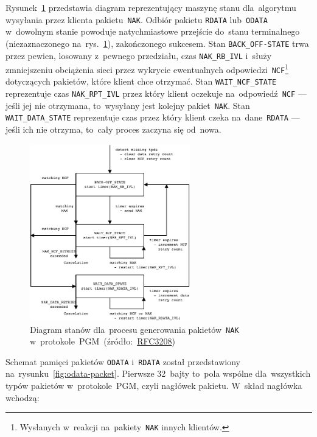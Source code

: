 \documentclass[thesis]{subfiles}
\begin{document}
Rysunek~\ref{fig:NAKflow} przedstawia diagram reprezentujący maszynę stanu dla~algorytmu wysyłania przez klienta pakietu~\texttt{NAK}. Odbiór pakietu \texttt{RDATA} lub~\texttt{ODATA} w~dowolnym stanie powoduje natychmiastowe przejście do~stanu terminalnego (niezaznaczonego na~rys.~\ref{fig:NAKflow}), zakończonego sukcesem. Stan \texttt{BACK\_OFF-STATE} trwa przez pewien, losowany z~pewnego przedziału, czas \texttt{NAK\_RB\_IVL} i~służy zmniejszeniu obciążenia sieci przez wykrycie ewentualnych odpowiedzi~\texttt{NCF}\footnote{Wysłanych w~reakcji na~pakiety~\texttt{NAK} innych klientów.} dotyczących pakietów, które klient chce otrzymać. Stan \texttt{WAIT\_NCF\_STATE} reprezentuje czas \texttt{NAK\_RPT\_IVL} przez który klient oczekuje na~odpowiedź~\texttt{NCF} --- jeśli jej nie otrzymana, to~wysyłany jest kolejny pakiet~\texttt{NAK}. Stan \texttt{WAIT\_DATA\_STATE} reprezentuje czas przez który klient czeka na~dane~\texttt{RDATA} --- jeśli ich nie otrzyma, to~cały proces zaczyna się od~nowa.

\begin{figure}
	\centering
	\includegraphics[width=0.62\textwidth]{img/PGF_protocol_NAK_flow_diagram}
	\caption[Diagram stanów dla~procesu generowania pakietów~\texttt{NAK} w~protokole~PGM]{Diagram stanów dla~procesu generowania pakietów~\texttt{NAK} w~protokole~PGM~(źródło:~\href{https://tools.ietf.org/html/rfc3208\#page-25}{RFC3208})~\cite{pgm-rfc}}
	\label{fig:NAKflow}
\end{figure}

Schemat pamięci pakietów \texttt{ODATA} i~\texttt{RDATA} został przedstawiony na~rysunku~\ref{fig:odata-packet}. Pierwsze 32~bajty to~pola wspólne dla~wszystkich typów pakietów w~protokole~PGM, czyli nagłówek pakietu. W~skład nagłówka wchodzą:\mynobreakpar
\end{document}
